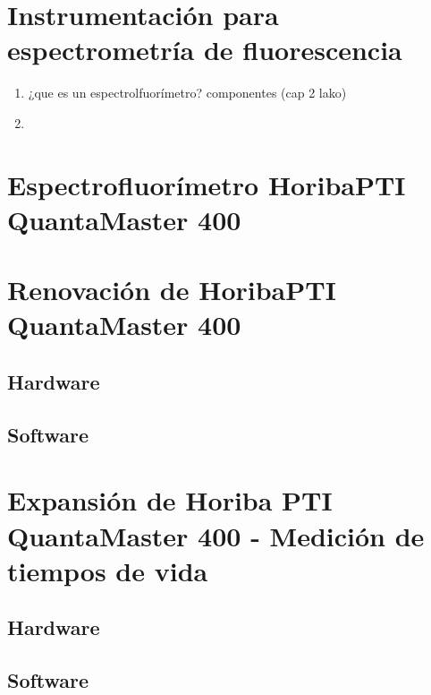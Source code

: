 
\section{Instrumentación para espectrometría de fluorescencia}

\begin{enumerate}
    \item ¿que es un espectrolfuorímetro? componentes (cap 2 lako)
    \item 
\end{enumerate}

\section{Espectrofluorímetro HoribaPTI QuantaMaster 400}
\section{Renovación de HoribaPTI QuantaMaster 400}
\subsection{Hardware}
\subsection{Software}
\section{Expansión de Horiba PTI QuantaMaster 400 - Medición de tiempos de vida}
\subsection{Hardware}
\subsection{Software}

